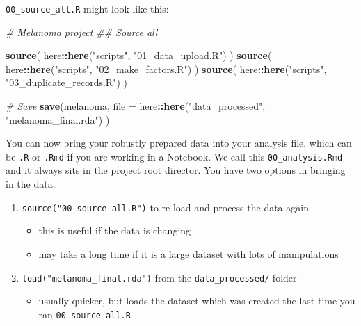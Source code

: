 \documentclass[
  12pt,
  krantz2]{krantz}
\makeatletter
\newenvironment{Shaded}{\begin{snugshade}}{\end{snugshade}}
\newcommand{\CommentTok}[1]{\textcolor[rgb]{0.56,0.35,0.01}{\textit{#1}}}
\newcommand{\DataTypeTok}[1]{\textcolor[rgb]{0.13,0.29,0.53}{#1}}
\newcommand{\KeywordTok}[1]{\textcolor[rgb]{0.13,0.29,0.53}{\textbf{#1}}}
\newcommand{\NormalTok}[1]{#1}
\newcommand{\OperatorTok}[1]{\textcolor[rgb]{0.81,0.36,0.00}{\textbf{#1}}}
\newcommand{\StringTok}[1]{\textcolor[rgb]{0.31,0.60,0.02}{#1}}
\providecommand{\tightlist}{%
  \setlength{\itemsep}{0pt}\setlength{\parskip}{0pt}}
\newenvironment{kframe}{%
\medskip{}
\setlength{\fboxsep}{.8em}
 \def\at@end@of@kframe{}%
 \ifinner\ifhmode%
  \def\at@end@of@kframe{\end{minipage}}%
  \begin{minipage}{\columnwidth}%
 \fi\fi%
 \def\FrameCommand##1{\hskip\@totalleftmargin \hskip-\fboxsep
 \colorbox{shadecolor}{##1}\hskip-\fboxsep
     \hskip-\linewidth \hskip-\@totalleftmargin \hskip\columnwidth}%
 \MakeFramed {\advance\hsize-\width
   \@totalleftmargin\z@ \linewidth\hsize
   \@setminipage}}%
 {\par\unskip\endMakeFramed%
 \at@end@of@kframe}
\renewenvironment{Shaded}{\begin{kframe}}{\end{kframe}}
\makeatother
\begin{document}
\texttt{00\_source\_all.R} might look like this:

\begin{Shaded}
\begin{Highlighting}[]
\CommentTok{# Melanoma project}
\CommentTok{## Source all}

\KeywordTok{source}\NormalTok{( here}\OperatorTok{::}\KeywordTok{here}\NormalTok{(}\StringTok{"scripts"}\NormalTok{, }\StringTok{"01_data_upload.R"}\NormalTok{) )}
\KeywordTok{source}\NormalTok{( here}\OperatorTok{::}\KeywordTok{here}\NormalTok{(}\StringTok{"scripts"}\NormalTok{, }\StringTok{"02_make_factors.R"}\NormalTok{) ) }
\KeywordTok{source}\NormalTok{( here}\OperatorTok{::}\KeywordTok{here}\NormalTok{(}\StringTok{"scripts"}\NormalTok{, }\StringTok{"03_duplicate_records.R"}\NormalTok{) ) }

\CommentTok{# Save}
\KeywordTok{save}\NormalTok{(melanoma, }\DataTypeTok{file =} 
\NormalTok{  here}\OperatorTok{::}\KeywordTok{here}\NormalTok{(}\StringTok{"data_processed"}\NormalTok{, }\StringTok{"melanoma_final.rda"}\NormalTok{)}
\NormalTok{)}
\end{Highlighting}
\end{Shaded}

You can now bring your robustly prepared data into your analysis file, which can be \texttt{.R} or \texttt{.Rmd} if you are working in a Notebook.
We call this \texttt{00\_analysis.Rmd} and it always sits in the project root director.
You have two options in bringing in the data.

\begin{enumerate}
\def\labelenumi{\arabic{enumi}.}
\tightlist
\item
  \texttt{source("00\_source\_all.R")} to re-load and process the data again

  \begin{itemize}
  \tightlist
  \item
    this is useful if the data is changing
  \item
    may take a long time if it is a large dataset with lots of manipulations
  \end{itemize}
\item
  \texttt{load("melanoma\_final.rda")} from the \texttt{data\_processed/} folder

  \begin{itemize}
  \tightlist
  \item
    usually quicker, but loads the dataset which was created the last time you ran \texttt{00\_source\_all.R}
  \end{itemize}
\end{enumerate}
\end{document}
